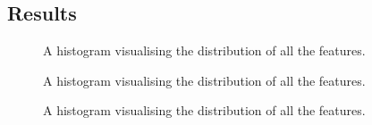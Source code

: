 \documentclass{article}
\begin{document}
\subsection{Results}
\begin{figure}[H]
  \caption{A histogram visualising the distribution of all the features.}
  \label{gpPopResults}
\end{figure}

\begin{figure}[H]
  \caption{A histogram visualising the distribution of all the features.}
  \label{ngpBestResults}
\end{figure}

\begin{figure}[H]
  \caption{A histogram visualising the distribution of all the features.}
  \label{sbgpBestResults}
\end{figure}
\end{document}

